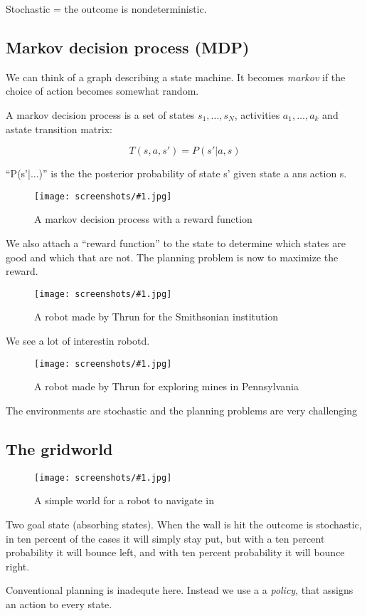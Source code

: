 \documentclass[a4, 12pt, english, USenglish]{scrreprt}
\newcommand{\screenshot}[2]{
\begin{figure}[htb]
\texttt{[image: screenshots/\#1.jpg]}
\label{#1}
\caption{#2}
\end{figure}}
\newcommand{\idx}[1]{{\em #1}\index{#1}}
\begin{document}
Stochastic = the outcome is nondeterministic.


\subsection{Markov decision process (MDP)}



We can think of  a graph   describing a state machine.  It becomes
\idx{markov} if the choice of action becomes somewhat random.

A markov decision process is a set of states \(s_1, \ldots, s_N\),
activities \(a_1, \ldots, a_k\) and  astate transition matrix:

\[
 T(s,a,s') = P(s' | a,s)
\]

``P(s'|...)''  is the the posterior probability of state s' given
state a ans action s.

\screenshot{markovwithreward}{A markov decision process with a reward function}

We also attach a ``reward function'' to the state to determine which
states are good and which that are not.  The planning problem is now
to maximize the reward.

\screenshot{bonnrobot}{A robot made by Thrun for the Smithsonian institution}


We see a lot of interestin robotd.

\screenshot{minerrobot}{A robot made by Thrun for exploring mines in Pennsylvania}

The environments are stochastic and the planning problems are very
challenging

\subsection{The gridworld}

\screenshot{gridworld}{A simple world for a robot to navigate in}

Two goal state (absorbing states).    When the wall is hit the outcome
is stochastic, in ten percent of the cases it will simply stay put,
but with a ten percent probability it will bounce left, and with ten
percent probability it will bounce right.

Conventional planning is inadequte here.   Instead we use a
a \idx{policy}, that assigns an action to every state.
\end{document}
